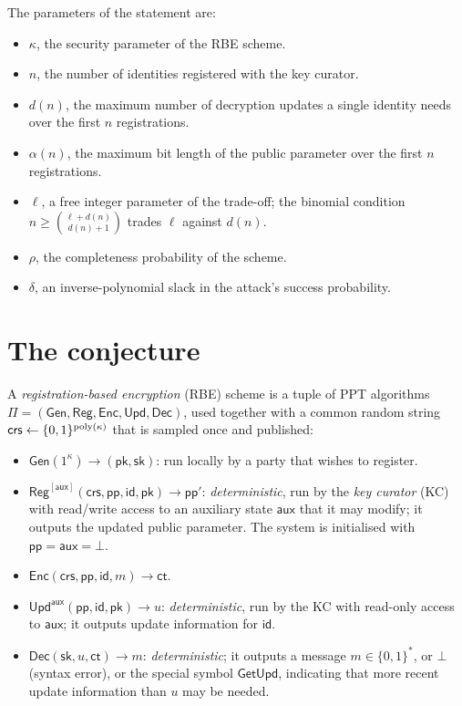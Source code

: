 \documentclass{aicr-conjecture}
\newcommand{\Gen}{\mathsf{Gen}}
\newcommand{\Reg}{\mathsf{Reg}}
\newcommand{\Enc}{\mathsf{Enc}}
\newcommand{\Upd}{\mathsf{Upd}}
\newcommand{\Dec}{\mathsf{Dec}}
\newcommand{\pp}{\mathsf{pp}}
\newcommand{\aux}{\mathsf{aux}}
\newcommand{\crs}{\mathsf{crs}}
\newcommand{\pk}{\mathsf{pk}}
\newcommand{\sk}{\mathsf{sk}}
\newcommand{\id}{\mathsf{id}}
\newcommand{\ct}{\mathsf{ct}}
\newcommand{\GetUpd}{\mathsf{GetUpd}}
\begin{document}
\medskip
\noindent The parameters of the statement are:
\begin{itemize}
\item $\kappa$, the security parameter of the RBE scheme.
\item $n$, the number of identities registered with the key curator.
\item $d(n)$, the maximum number of decryption updates a single identity
  needs over the first $n$ registrations.
\item $\alpha(n)$, the maximum bit length of the public parameter over
  the first $n$ registrations.
\item $\ell$, a free integer parameter of the trade-off; the binomial
  condition $n \ge \binom{\ell+d(n)}{d(n)+1}$ trades $\ell$
  against $d(n)$.
\item $\rho$, the completeness probability of the scheme.
\item $\delta$, an inverse-polynomial slack in the attack's success
  probability.
\end{itemize}

\section{The conjecture}\label{sec:conjectures}

\begin{definition}\label{def:rbe}
A \emph{registration-based encryption} (RBE) scheme is a tuple of PPT
algorithms $\Pi = (\Gen, \Reg, \Enc, \Upd, \Dec)$, used together with a
common random string $\crs \leftarrow \{0,1\}^{\poly(\kappa)}$ that is
sampled once and published:
\begin{itemize}
  \item $\Gen(1^{\kappa}) \to (\pk,\sk)$: run locally by a party that
    wishes to register.
  \item $\Reg^{[\aux]}(\crs,\pp,\id,\pk) \to \pp'$: \emph{deterministic},
    run by the \emph{key curator} (KC) with read/write access to an
    auxiliary state $\aux$ that it may modify; it outputs the updated
    public parameter. The system is initialised with
    $\pp = \aux = \bot$.
  \item $\Enc(\crs,\pp,\id,m) \to \ct$.
  \item $\Upd^{\aux}(\pp,\id,\pk) \to u$: \emph{deterministic}, run by
    the KC with read-only access to $\aux$; it outputs update
    information for $\id$.
  \item $\Dec(\sk,u,\ct) \to m$: \emph{deterministic}; it outputs a
    message $m \in \{0,1\}^{*}$, or $\bot$ (syntax error), or the
    special symbol $\GetUpd$, indicating that more recent update
    information than $u$ may be needed.
\end{itemize}
\end{definition}
\end{document}

